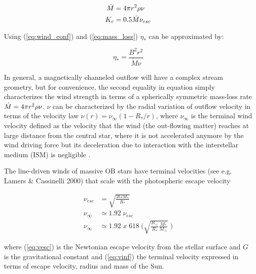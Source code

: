 \documentclass[fleqn,usenatbib]{mnras}
\begin{document}
\begin{ceqn}
\begin{align}
    \Dot{M} &= 4\pi r^2\rho\nu \label{eq:mass_loss}\\
    K_e &= 0.5\Dot{M}\nu_{esc}
\end{align}
\end{ceqn}

Using (\ref{eq:wind_conf}) and (\ref{eq:mass_loss}) $\eta_*$ can be approximated by: 
\begin{ceqn}
\begin{equation}
    \eta_* = \frac{B^{2}r^{2}}{\Dot{M}\nu} \label{eq:wind_conf2}
\end{equation}
\end{ceqn}

 
In general, a magnetically channeled outflow will have a complex stream geometry, but for convenience, the second equality in equation simply characterizes the wind strength in terms of a spherically symmetric mass-loss rate $\Dot{M}=4\pi r^{2}\rho\nu$. $\nu$ can be characterized by the radial variation of outflow velocity in terms of the velocity law $ \nu(r) = \nu_\infty (1-R_*/r)$, where $\nu_\infty$ is the terminal wind velocity defined as the velocity that the wind (the out-flowing matter) reaches at large distance from the central star, where it is not accelerated anymore by the wind driving force but its deceleration due to interaction with the interstellar medium (ISM) is negligible \citep{Niedzielski2002}.\par

The line-driven winds of massive OB stars have terminal velocities (see e.g. Lamers \& Cassinelli 2000) that scale with the photospheric escape velocity 
\begin{ceqn}
\begin{align}
\nu_{esc} &= \sqrt{\frac{2GM_*}{R_*}} \label{eq:vesc} \\
\nu_\infty &\simeq 1.92 \;\nu_{esc}\\
\nu_\infty &\simeq 1.92 \; x \; 618 \; \Bigg(\sqrt{\frac{R_{\sun}}{R_*}\frac{M_*}{M_{\sun}}} \;\Bigg) \label{eq:vinf}
\end{align}
\end{ceqn}
where (\ref{eq:vesc}) is the Newtonian escape velocity from the stellar surface and $G$ is the gravitational constant and (\ref{eq:vinf}) the terminal velocity expressed in terms of escape velocity, radius and mass of the Sun.\par
\end{document}

